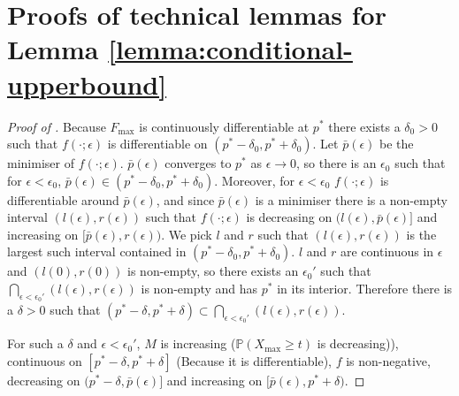 \documentclass[11pt,a4paper]{article}
\numberwithin{equation}{section}
\newenvironment{cleverproof}[1]
  {\begin{proof}[Proof of \Cref{#1}]}
  {\end{proof}}
\begin{document}
\section{Proofs of technical lemmas for Lemma \ref{lemma:conditional-upperbound}}\label{proofs:technical-lemmas}
\begin{cleverproof}{lemma:delta-choice}
    Because $F_{\max}$ is continuously differentiable at $p^*$ there exists a $\delta_0>0$ such that $f(\cdot;\epsilon)$ is differentiable on $(p^*-\delta_0,p^*+\delta_0)$. Let $\bar{p}(\epsilon)$ be the minimiser of $f(\cdot;\epsilon)$. $\bar{p}(\epsilon)$ converges to $p^*$ as $\epsilon\to 0$, so there is an $\epsilon_0$ such that for $\epsilon<\epsilon_0$, $\bar{p}(\epsilon)\in(p^*-\delta_0,p^*+\delta_0)$. Moreover, for $\epsilon<\epsilon_0$ $f(\cdot;\epsilon)$ is differentiable around $\bar{p}(\epsilon)$, and since $\bar{p}(\epsilon)$ is a minimiser there is a non-empty interval $(l(\epsilon),r(\epsilon))$ such that $f(\cdot;\epsilon)$ is decreasing on $(l(\epsilon),\bar{p}(\epsilon)]$ and increasing on $[\bar{p}(\epsilon),r(\epsilon))$. 
    We pick $l$ and $r$ such that $(l(\epsilon),r(\epsilon))$ is the largest such interval contained in $(p^*-\delta_0,p^*+\delta_0)$. 
    $l$ and $r$ are continuous in $\epsilon$ and $(l(0),r(0))$ is non-empty, so there exists an $\epsilon_0'$ such that $\bigcap\limits_{\epsilon<\epsilon_0'}(l(\epsilon),r(\epsilon))$ is non-empty and has $p^*$ in its interior.
    Therefore there is a $\delta>0$ such that $(p^*-\delta,p^*+\delta)\subset \bigcap\limits_{\epsilon<\epsilon_0'}(l(\epsilon),r(\epsilon))$. 
    
    For such a $\delta$ and $\epsilon<\epsilon_0'$, $M$ is increasing ($\mathbb{P}(X_{\max}\ge t)$ is decreasing)), continuous on $[p^*-\delta,p^*+\delta]$ (Because it is differentiable), $f$ is non-negative, decreasing on $(p^*-\delta,\bar{p}(\epsilon)]$ and increasing on $[\bar{p}(\epsilon),p^*+\delta)$.
\end{cleverproof}
\end{document}
